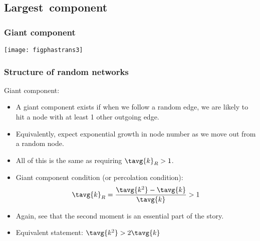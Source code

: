 \subsection{Largest\ component}

\begin{frame}[label=]
  \frametitle{Giant component}

  \texttt{[image: figphastrans3]}

\end{frame}

\begin{frame}[label=]
  \frametitle{Structure of random networks}
  
  \begin{block}{Giant component:}
    \begin{itemize}
    \item<1-> 
      A giant component exists if when
      we follow a random edge, we are likely
      to hit a node with \alert{at least 1} other
      outgoing edge.
    \item<2-> Equivalently, expect exponential growth in
      node number as we move out from 
      a random node.
    \item<3-> 
      All of this is the same as requiring $\tavg{k}_R > 1$.
    \item<4-> 
      \alert{Giant component condition} (or percolation condition):
      $$
      \tavg{k}_R 
      =
      \frac{\tavg{k^2}-\tavg{k}}{\tavg{k}}
      > 
      1
      $$
    \item<5->
      Again, see that the second moment is an essential
      part of the story.
    \item<6->
      Equivalent statement:
      $
      \tavg{k^2} > 2\tavg{k}
      $
    \end{itemize}
    
  \end{block}
  
\end{frame}

